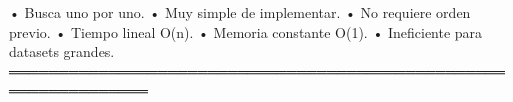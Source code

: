 \begin{dsaresumen}

• Busca uno por uno.
• Muy simple de implementar.
• No requiere orden previo.
• Tiempo lineal O(n).
• Memoria constante O(1).
• Ineficiente para datasets grandes.
════════════════════════════════════════════════════════════════

\end{dsaresumen}



